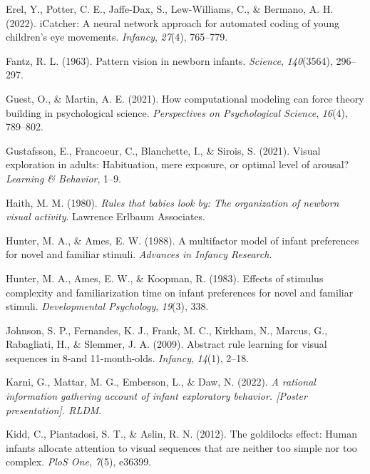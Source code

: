\documentclass[10pt, letterpaper]{article}
\newenvironment{CSLReferences}%
  {}%
  {\par}
\begin{document}
\begin{CSLReferences}{1}{0}
\leavevmode{}%
Erel, Y., Potter, C. E., Jaffe-Dax, S., Lew-Williams, C., \& Bermano, A.
H. (2022). iCatcher: A neural network approach for automated coding of
young children's eye movements. \emph{Infancy}, \emph{27}(4), 765--779.

\leavevmode{}%
Fantz, R. L. (1963). Pattern vision in newborn infants. \emph{Science},
\emph{140}(3564), 296--297.

\leavevmode{}%
Guest, O., \& Martin, A. E. (2021). How computational modeling can force
theory building in psychological science. \emph{Perspectives on
Psychological Science}, \emph{16}(4), 789--802.

\leavevmode{}%
Gustafsson, E., Francoeur, C., Blanchette, I., \& Sirois, S. (2021).
Visual exploration in adults: Habituation, mere exposure, or optimal
level of arousal? \emph{Learning \& Behavior}, 1--9.

\leavevmode{}%
Haith, M. M. (1980). \emph{Rules that babies look by: The organization
of newborn visual activity}. Lawrence Erlbaum Associates.

\leavevmode{}%
Hunter, M. A., \& Ames, E. W. (1988). A multifactor model of infant
preferences for novel and familiar stimuli. \emph{Advances in Infancy
Research}.

\leavevmode{}%
Hunter, M. A., Ames, E. W., \& Koopman, R. (1983). Effects of stimulus
complexity and familiarization time on infant preferences for novel and
familiar stimuli. \emph{Developmental Psychology}, \emph{19}(3), 338.

\leavevmode{}%
Johnson, S. P., Fernandes, K. J., Frank, M. C., Kirkham, N., Marcus, G.,
Rabagliati, H., \& Slemmer, J. A. (2009). Abstract rule learning for
visual sequences in 8-and 11-month-olds. \emph{Infancy}, \emph{14}(1),
2--18.

\leavevmode{}%
Karni, G., Mattar, M. G., Emberson, L., \& Daw, N. (2022). \emph{A
rational information gathering account of infant exploratory behavior.
{[}Poster presentation{]}. RLDM}.

\leavevmode{}%
Kidd, C., Piantadosi, S. T., \& Aslin, R. N. (2012). The goldilocks
effect: Human infants allocate attention to visual sequences that are
neither too simple nor too complex. \emph{PloS One}, \emph{7}(5),
e36399.


\end{CSLReferences}
\end{document}
